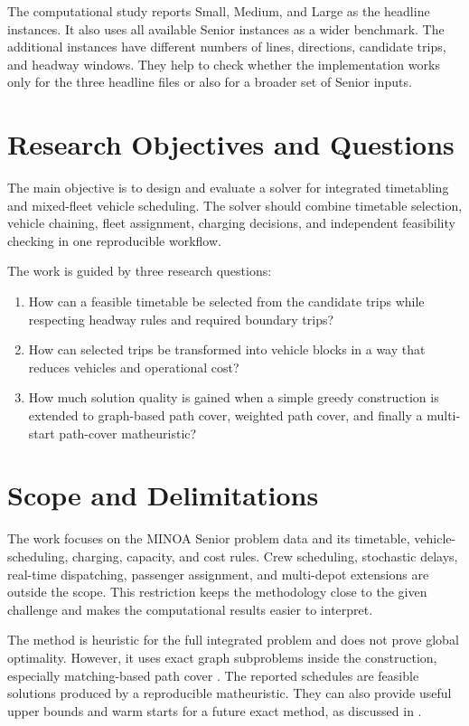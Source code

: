 The computational study reports Small, Medium, and Large as the headline instances. It also
uses all available Senior instances as a wider benchmark. The additional
instances have different numbers of lines, directions, candidate trips, and
headway windows. They help to check whether the implementation works only for
the three headline files or also for a broader set of Senior inputs.

\section{Research Objectives and Questions}

The main objective is to design and evaluate a solver for integrated
timetabling and mixed-fleet vehicle scheduling. The solver should combine
timetable selection, vehicle chaining, fleet assignment, charging decisions,
and independent feasibility checking in one reproducible workflow.

The work is guided by three research questions:

\begin{enumerate}
    \item How can a feasible timetable be selected from the candidate trips
    while respecting headway rules and required boundary trips?
    \item How can selected trips be transformed into vehicle blocks in a way
    that reduces vehicles and operational cost?
    \item How much solution quality is gained when a simple greedy construction
    is extended to graph-based path cover, weighted path cover, and finally a
    multi-start path-cover matheuristic?
\end{enumerate}

\section{Scope and Delimitations}

The work focuses on the MINOA Senior problem data and its timetable,
vehicle-scheduling, charging, capacity, and cost rules. Crew scheduling,
stochastic delays, real-time dispatching, passenger assignment, and multi-depot
extensions are outside the scope. This restriction keeps the methodology close
to the given challenge and makes the computational results easier to interpret.

The method is heuristic for the full integrated problem and does not prove
global optimality. However, it uses exact graph subproblems inside the
construction, especially matching-based path cover
\cite{dulmage1958,edmonds1965,galil1986}. The reported schedules are feasible
solutions produced by a reproducible matheuristic. They can also provide useful
upper bounds and warm starts for a future exact method, as discussed in
.

